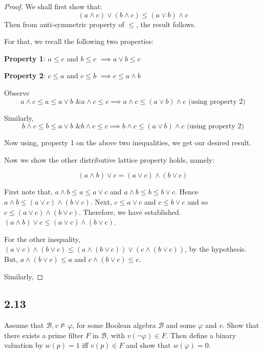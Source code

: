 \documentclass[12pt]{article}
\begin{document}
\begin{proof}
We shall first show that:
$$(a \wedge c) \vee (b \wedge c) \leq (a \vee b) \wedge c$$ 
Then from anti-symmetric property of $\leq$, the result follows.

For that, we recall the following two properties:

\textbf{Property 1}: $a \leq c$ and $b \leq c$ $\implies a \vee b \leq c$

\textbf{Property 2}: $c \leq a$ and $c \leq b$ $\implies c \leq a \wedge b$

Observe 
$$a \wedge c \leq a \leq a \vee b \text{ \& } a \wedge c \leq c \implies a \wedge c \leq (a \vee b) \wedge c \text{ (using property 2)}$$

Similarly,
$$b \wedge c \leq b \leq a \vee b \text{ \& } b \wedge c \leq c \implies b \wedge c \leq (a \vee b) \wedge c \text{ (using property 2)}$$

Now using, property 1 on the above two inequalities, we get our desired result.

Now we show the other distributive lattice property holds, namely:

$$(a \wedge b) \vee c = (a \vee c) \wedge (b \vee c)$$

First note that, $a \wedge b \leq a \leq a \vee c$ and $a \wedge b \leq b \leq b \vee c$. Hence $a \wedge b \leq (a \vee c) \wedge (b \vee c)$. Next, $c \leq a \vee c$ and $c \leq b \vee c$ and so $c \leq (a \vee c) \wedge (b \vee c)$. Therefore, we have established. $(a \wedge b) \vee c \leq (a \vee c) \wedge (b \vee c)$.

For the other inequality, $(a \vee c) \wedge (b \vee c) \leq (a \wedge (b \vee c)) \vee (c \wedge (b \vee c))$, by the hypothesis. But, $a \wedge (b \vee c) \leq a$ and $c \wedge (b \vee c) \leq c$.

Similarly, 

\end{proof}

\subsection*{2.13}
Assume that $\mathcal{B}, v \not \vDash \varphi$, for some Boolean algebra $\mathcal{B}$ and some $\varphi$ and $v$. Show that there exists a prime filter $F$ in $\mathcal{B}$, with $v(\neg \varphi) \in F$. Then define a binary valuation by $w(p) = 1$ iff $v(p) \in F$ and show that $w(\varphi) = 0$. \\
\end{document}
